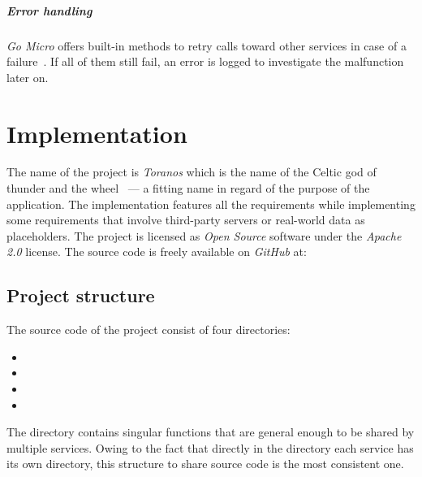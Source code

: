 \documentclass[12pt,a4paper,twoside]{report}
\begin{document}
\paragraph{Error handling}
\textit{Go Micro} offers built-in methods to retry calls toward
other services in case of a failure~\cite{go-micro}. If all of them still fail,
an error is logged to investigate the malfunction later on.



\chapter{Implementation} \label{chap:implementation}



The name of the project is \textit{Toranos} which is the name of the
Celtic god of thunder and the wheel~\cite{celtic-mythology} ---
a fitting name in regard of the purpose of the application.
The implementation features all the requirements while implementing
some requirements that involve third-party servers or real-world data
as placeholders.
The project is licensed as \textit{Open Source} software under the
\textit{Apache 2.0} license. The source code is freely available on \textit{GitHub} at:


\section{Project structure}

The source code of the project consist of four directories:
\begin{itemize}[noitemsep]
\item {}
\item {}
\item {}
\item {}
\end{itemize}
The  directory contains singular functions that are general
enough to be shared by multiple services. Owing to the fact that directly in the
 directory each service has its own directory, this structure
to share source code is the most consistent one.
\end{document}
